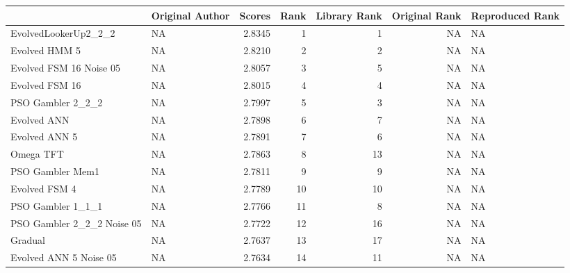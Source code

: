 \begin{tabular}{llrrrrl}
\toprule
{} &                     Original Author &  Scores &  Rank &  Library Rank &  Original Rank & Reproduced Rank \\
\midrule
EvolvedLookerUp2\_2\_2       &                                  NA &  2.8345 &     1 &             1 &             NA &              NA \\
Evolved HMM 5              &                                  NA &  2.8210 &     2 &             2 &             NA &              NA \\
Evolved FSM 16 Noise 05    &                                  NA &  2.8057 &     3 &             5 &             NA &              NA \\
Evolved FSM 16             &                                  NA &  2.8015 &     4 &             4 &             NA &              NA \\
PSO Gambler 2\_2\_2          &                                  NA &  2.7997 &     5 &             3 &             NA &              NA \\
Evolved ANN                &                                  NA &  2.7898 &     6 &             7 &             NA &              NA \\
Evolved ANN 5              &                                  NA &  2.7891 &     7 &             6 &             NA &              NA \\
Omega TFT                  &                                  NA &  2.7863 &     8 &            13 &             NA &              NA \\
PSO Gambler Mem1           &                                  NA &  2.7811 &     9 &             9 &             NA &              NA \\
Evolved FSM 4              &                                  NA &  2.7789 &    10 &            10 &             NA &              NA \\
PSO Gambler 1\_1\_1          &                                  NA &  2.7766 &    11 &             8 &             NA &              NA \\
PSO Gambler 2\_2\_2 Noise 05 &                                  NA &  2.7722 &    12 &            16 &             NA &              NA \\
Gradual                    &                                  NA &  2.7637 &    13 &            17 &             NA &              NA \\
Evolved ANN 5 Noise 05     &                                  NA &  2.7634 &    14 &            11 &             NA &              NA \\

\end{tabular}
